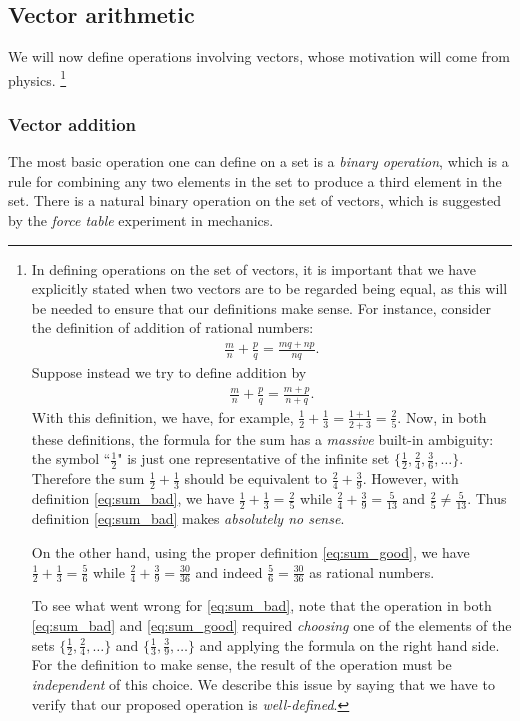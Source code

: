 \documentclass[12pt,letterpaper,reqno]{article}
\numberwithin{equation}{section}
\begin{document}
\subsection{Vector arithmetic}
We will now define operations involving vectors, whose motivation will come from physics. \footnote{In defining operations on the set of vectors, it is important that we have explicitly stated when two vectors are to be regarded being equal, as this will be needed to ensure that our definitions make sense. For instance, consider the definition of addition of rational numbers:
\begin{align}\label{eq:sum_good}
	\frac{m}{n}+\frac{p}{q}=\frac{mq+np}{nq}.
\end{align}
Suppose instead we try to define addition by 
\begin{align}\label{eq:sum_bad}
	\frac{m}{n}+\frac{p}{q}=\frac{m+p}{n+q}.
\end{align}
With this definition, we have, for example,
	$\frac{1}{2}+\frac{1}{3}=\frac{1+1}{2+3}=\frac{2}{5}$.
Now, in both these definitions, the formula for the sum has a \emph{massive} built-in ambiguity: the symbol ``$\frac{1}{2}$" is just one representative of the infinite set $\{\frac{1}{2}, \frac{2}{4}, \frac{3}{6},\dots\}$. Therefore the sum
	$\frac{1}{2}+\frac{1}{3}$
should be equivalent to 
	$\frac{2}{4}+\frac{3}{9}$.
However, with definition \eqref{eq:sum_bad}, we have
$\frac{1}{2}+\frac{1}{3}=\frac{2}{5}$
while
$\frac{2}{4}+\frac{3}{9}=\frac{5}{13}$
and $\frac{2}{5} \neq \frac{5}{13}$. Thus definition \eqref{eq:sum_bad} makes \emph{absolutely no sense}.

On the other hand, using the proper definition \eqref{eq:sum_good}, we have
	$\frac{1}{2}+\frac{1}{3}=\frac{5}{6}$
while
$\frac{2}{4}+\frac{3}{9}=\frac{30}{36}$ 
and indeed $\frac{5}{6}=\frac{30}{36}$ as rational numbers.

To see what went wrong for \eqref{eq:sum_bad}, note that the operation in both \eqref{eq:sum_bad} and \eqref{eq:sum_good} required \emph{choosing} one of the elements of the sets $\{\frac{1}{2},\frac{2}{4},\dots\}$ and $\{\frac{1}{3},\frac{3}{9},\dots\}$ and applying the formula on the right hand side. For the definition to make sense, the result of the operation must be \emph{independent} of this choice. We describe this issue by saying that we have to verify that our proposed operation is \emph{well-defined}.}

\subsubsection{Vector addition}
The most basic operation one can define on a set is a \emph{binary operation}, which is a rule for combining any two elements in the set to produce a third element in the set. There is a natural binary operation on the set of vectors, which is suggested by the \emph{force table} experiment in mechanics.
\end{document}
